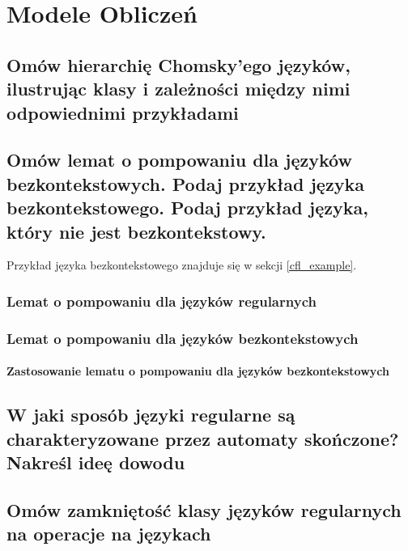 \chapter{Modele Obliczeń} 

\section{Omów hierarchię Chomsky'ego języków, ilustrując klasy i zależności między nimi odpowiednimi przykładami}


\section{Omów lemat o pompowaniu dla języków bezkontekstowych. Podaj przykład języka bezkontekstowego. Podaj przykład języka, który nie jest bezkontekstowy.}
Przykład języka bezkontekstowego znajduje się w sekcji \ref{cfl_example}.
\subsection{Lemat o pompowaniu dla języków regularnych}
\label{regular-pumping}


\subsection{Lemat o pompowaniu dla języków bezkontekstowych}


\subsubsection{Zastosowanie lematu o pompowaniu dla języków bezkontekstowych}
\label{context-pumping}


\section{W jaki sposób języki regularne są charakteryzowane przez automaty skończone? Nakreśl ideę dowodu}


\section{Omów zamkniętość klasy języków regularnych na operacje na językach}


